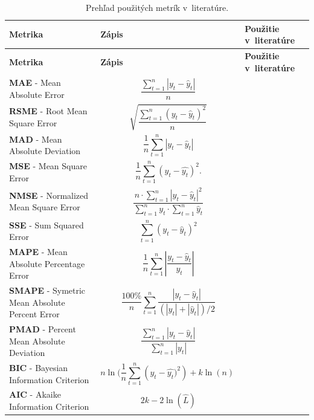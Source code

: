 \documentclass[thesismargins, thesislinespacing, openright, upjsfrontpage]{rnthesis}
\begin{document}
\begin{longtable}[p]{ | p{4cm} | p{5.5cm} | p{4.5cm} | }
    \caption{Prehľad použitých metrík v~literatúre.}
    \label{tab:c3_metrics}\\
    \hline \textbf{Metrika} & \textbf{Zápis} & \textbf{Použitie v~literatúre}\\
    \endfirsthead
    \hline \textbf{Metrika} & \textbf{Zápis} & \textbf{Použitie v~literatúre}\\
    \endhead
     \hline \textbf{MAE} - Mean Absolute Error & $${{\frac {\sum _{t=1}^{n}\left|y_{t}-\hat{y}_{t}\right|}{n}}}$$ & \cite{tang2018disclosure} \\
     \hline \textbf{RSME} - Root Mean Square Error & $${{\sqrt {\frac {\sum _{t=1}^{n}({y}_{t}-\hat{y}_{t})^{2}}{n}}}}$$ & \cite{tang2018disclosure,tang2017big,condon2008analysis} \\
     \hline \textbf{MAD} - Mean Absolute Deviation & $${{\frac {1}{n}}\sum _{t=1}^{n}{\left|{y_{t}-{\hat {y}}_{t}}\right|}}$$ & \cite{fang2019deep} \\
     \hline \textbf{MSE} - Mean Square Error & $${{\frac {1}{n}}\sum _{t=1}^{n}(y_{t}-{\hat {y_{t}}})^{2}.}$$ & \cite{fang2019deep,werner2017time} \\
     \hline \textbf{NMSE} - Normalized Mean Square Error & $$\frac{n\cdot\sum _{t=1}^{n}\left|y_{t} - \hat{y}_{t}\right|^{2}}{\sum _{t=1}^{n}{y_{t}} \cdot \sum _{t=1}^{n}{\hat{y}_{t}}}$$ & \cite{zang2019adaptive,madan2018predicting} \\
     \hline \textbf{SSE} - Sum Squared Error & $${\sum _{t=1}^{n}(y_{t}-\hat{y}_{t})^{2}}$$ & \cite{cortez2012multi} \\
    
     \hline \textbf{MAPE} - Mean Absolute Percentage Error & $${\frac  {1}{n}}\sum _{{t=1}}^{n}\left|{\frac  {y_{t}-\hat{y}_{t}}{y_{t}}}\right|$$ & \cite{jiang2004detecting,cortez2012multi,fang2019deep,tang2018disclosure,werner2017time} \\
     \hline \textbf{SMAPE} - Symetric Mean Absolute Percent Error & $${\frac {100\%}{n}}\sum _{t=1}^{n}{\frac {\left|y_{t}-\hat{y}_{t}\right|}{(|y_{t}|+|\hat{y}_{t}|)/2}}$$ & \cite{roumani2015time,pokhrel2017cybersecurity} \\
     \hline \textbf{PMAD} - Percent Mean Absolute Deviation & $${\frac {\sum _{t=1}^{n}\left|y_{t}-{\hat {y}}_{t}\right|}{\sum _{t=1}^{n}\left|y_{t}\right|}}$$ & \cite{fang2019deep,zhan2015predicting} \\
     
     \hline \textbf{BIC} - Bayesian Information Criterion & $${n\ln({\frac {1}{n}}\sum _{t=1}^{n}({y_{t}-{\widehat {y_{t}}})^{2}})+k\ln(n)\ }$$ & \cite{tang2016exploiting} \\
     \hline \textbf{AIC} - Akaike Information Criterion & $${2k-2\ln({\hat {L}})}$$ & \cite{tang2016exploiting,zhan2015predicting,wei2012intrusion} \\
     \hline

\end{longtable}
\end{document}
